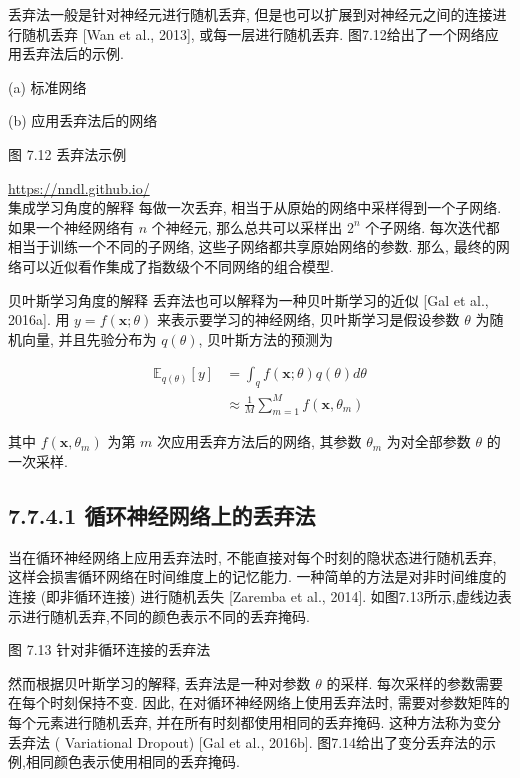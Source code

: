 \documentclass[10pt]{article}
\begin{document}
丢弃法一般是针对神经元进行随机丢弃, 但是也可以扩展到对神经元之间的连接进行随机丢弃 [Wan et al., 2013], 或每一层进行随机丢弃. 图7.12给出了一个网络应用丢弃法后的示例.



(a) 标准网络



(b) 应用丢弃法后的网络

图 7.12 丢弃法示例

\href{https://nndl.github.io/}{https://nndl.github.io/}\\
集成学习角度的解释 每做一次丢弃, 相当于从原始的网络中采样得到一个子网络. 如果一个神经网络有 $n$ 个神经元, 那么总共可以采样出 $2^{n}$ 个子网络. 每次迭代都相当于训练一个不同的子网络, 这些子网络都共享原始网络的参数. 那么, 最终的网络可以近似看作集成了指数级个不同网络的组合模型.

贝叶斯学习角度的解释 丢弃法也可以解释为一种贝叶斯学习的近似 [Gal et al., 2016a]. 用 $y=f(\boldsymbol{x} ; \theta)$ 来表示要学习的神经网络, 贝叶斯学习是假设参数 $\theta$ 为随机向量, 并且先验分布为 $q(\theta)$, 贝叶斯方法的预测为


\begin{align*}
\mathbb{E}_{q(\theta)}[y] & =\int_{q} f(\boldsymbol{x} ; \theta) q(\theta) d \theta  \tag{7.75}\\
& \approx \frac{1}{M} \sum_{m=1}^{M} f\left(\boldsymbol{x}, \theta_{m}\right) \tag{7.76}
\end{align*}


其中 $f\left(\boldsymbol{x}, \theta_{m}\right)$ 为第 $m$ 次应用丢弃方法后的网络, 其参数 $\theta_{m}$ 为对全部参数 $\theta$ 的一次采样.

\subsection*{7.7.4.1 循环神经网络上的丢弃法}
当在循环神经网络上应用丢弃法时, 不能直接对每个时刻的隐状态进行随机丢弃, 这样会损害循环网络在时间维度上的记忆能力. 一种简单的方法是对非时间维度的连接 (即非循环连接) 进行随机丢失 [Zaremba et al., 2014]. 如图7.13所示,虚线边表示进行随机丢弃,不同的颜色表示不同的丢弃掩码.



图 7.13 针对非循环连接的丢弃法

然而根据贝叶斯学习的解释, 丢弃法是一种对参数 $\theta$ 的采样. 每次采样的参数需要在每个时刻保持不变. 因此, 在对循环神经网络上使用丢弃法时, 需要对参数矩阵的每个元素进行随机丢弃, 并在所有时刻都使用相同的丢弃掩码. 这种方法称为变分丢弃法 ( Variational Dropout) [Gal et al., 2016b]. 图7.14给出了变分丢弃法的示例,相同颜色表示使用相同的丢弃掩码.
\end{document}
